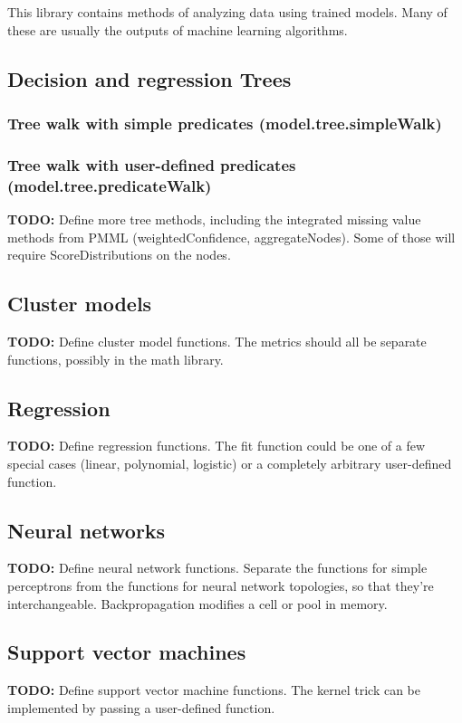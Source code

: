\documentclass{article}
\theoremstyle{definition}
\begin{document}
This library contains methods of analyzing data using trained models.  Many of these are usually the outputs of machine learning algorithms.

\subsection{Decision and regression Trees}

\subsubsection{Tree walk with simple predicates (model.tree.simpleWalk)}

\subsubsection{Tree walk with user-defined predicates (model.tree.predicateWalk)}

{\bf TODO:} Define more tree methods, including the integrated missing value methods from PMML (weightedConfidence, aggregateNodes).  Some of those will require ScoreDistributions on the nodes.

\subsection{Cluster models}

{\bf TODO:} Define cluster model functions.  The metrics should all be separate functions, possibly in the math library.

\subsection{Regression}

{\bf TODO:} Define regression functions.  The fit function could be one of a few special cases (linear, polynomial, logistic) or a completely arbitrary user-defined function.

\subsection{Neural networks}

{\bf TODO:} Define neural network functions.  Separate the functions for simple perceptrons from the functions for neural network topologies, so that they're interchangeable.  Backpropagation modifies a cell or pool in memory.

\subsection{Support vector machines}

{\bf TODO:} Define support vector machine functions.  The kernel trick can be implemented by passing a user-defined function.
\end{document}
